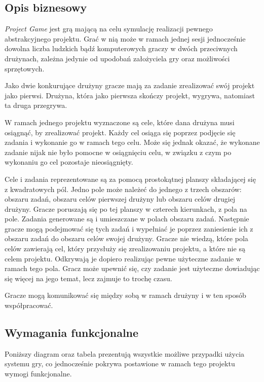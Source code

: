 \documentclass[11pt]{article}
\let\Oldsubsection\subsection
\renewcommand{\subsection}{\FloatBarrier\Oldsubsection}
\begin{document}
\subsection{Opis biznesowy}
\par
\textit{Project Game} jest grą mającą na celu symulację realizacji pewnego abstrakcyjnego projektu. Grać w nią może w ramach jednej sesji jednocześnie dowolna liczba ludzkich bądź komputerowych graczy w dwóch przeciwnych drużynach, zależna jedynie od upodobań założyciela gry oraz możliwości sprzętowych.
\par
Jako dwie konkurujące drużyny gracze mają za zadanie zrealizować swój projekt jako pierwsi. Drużyna, która jako pierwsza skończy projekt, wygrywa, natomiast ta druga przegrywa.
\par
W ramach jednego projektu wyznaczone są cele, które dana drużyna musi osiągnąć, by zrealizować projekt. Każdy cel osiąga się poprzez podjęcie się zadania i wykonanie go w ramach tego celu. Może się jednak okazać, że wykonane zadanie nijak nie było pomocne w osiągnięciu celu, w związku z czym po wykonaniu go cel pozostaje nieosiągnięty.
\par
Cele i zadania reprezentowane są za pomocą prostokątnej planszy składającej się z kwadratowych pól. Jedno pole może należeć do jednego z trzech obszarów: obszaru zadań, obszaru celów pierwszej drużyny lub obszaru celów drugiej drużyny. Gracze poruszają się po tej planszy w czterech kierunkach, z pola na pole. Zadania generowane są i umieszczane w polach obszaru zadań. Następnie gracze mogą podejmować się tych zadań i wypełniać je poprzez zaniesienie ich z obszaru zadań do obszaru celów swojej drużyny. Gracze nie wiedzą, które pola celów zawierają cel, który przysłuży się zrealizowaniu projektu, a które nie są celem projektu. Odkrywają je dopiero realizując pewne użyteczne zadanie w ramach tego pola. Gracz może upewnić się, czy zadanie jest użyteczne dowiadując się więcej na jego temat, lecz zajmuje to trochę czasu.
\par
Gracze mogą komunikować się między sobą w ramach drużyny i w ten sposób współpracować.

\subsection{Wymagania funkcjonalne}
\par
Poniższy diagram oraz tabela prezentują wszystkie możliwe przypadki użycia systemu gry, co jednocześnie pokrywa postawione w ramach tego projektu wymogi funkcjonalne.
\end{document}

